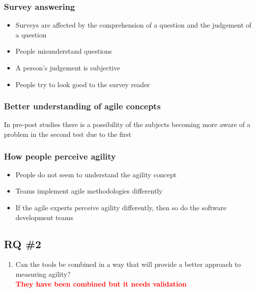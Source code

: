 \clearpage

\subsubsection{Survey answering}

\begin{itemize}
	\item Surveys are affected by the comprehension of a question and the judgement of a question \cite{Wagner_Zeglovits}
	\item People misunderstand questions
	\item A person's judgement is subjective
	\item People try to look good to the survey reader \cite{feldt_angelis_torkar_samuelsson}
\end{itemize}

\clearpage

\subsubsection{Better understanding of agile concepts}

In pre-post studies there is a possibility of the subjects becoming more aware of a problem in the second test due to the first

\clearpage

\subsubsection{How people perceive agility}

\begin{itemize}
	\item People do not seem to understand the agility concept \cite{Wang_Conboy}
	\item Teams implement agile methodologies differently
	\item If the agile experts perceive agility differently, then so do the software development teams
\end{itemize}

\clearpage

\subsection{RQ \#2}

\begin{enumerate}
	\setcounter{enumi}{\theenumTemp}
	\item Can the tools be combined in a way that will provide a better approach to measuring agility? \\ \textcolor{red}{\textbf{They have been combined but it needs validation}}
\end{enumerate}

\clearpage